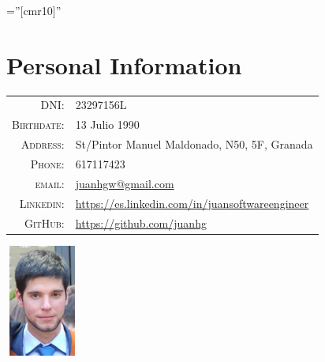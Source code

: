 \documentclass[a4paper,10pt]{article} %
\begin{document}
\pagestyle{empty} %

\font\fb=''[cmr10]'' %


\par{\bigskip\par} %

\section{Personal Information}

\noindent\begin{minipage}{0.3\textwidth}%
\begin{tabular}{rl}
\textsc{DNI:} & 23297156L \\
\textsc{Birthdate:} &  13 Julio 1990 \\
\textsc{Address:} & St/Pintor Manuel Maldonado, N50, 5F, Granada \\
\textsc{Phone:} & 617117423\\
\textsc{email:} & \href{mailto:juanhgw@gmail.com}{juanhgw@gmail.com} \\
\textsc{Linkedin:} & \url{https://es.linkedin.com/in/juansoftwareengineer} \\
\textsc{GitHub:} & \url{https://github.com/juanhg}
\end{tabular}
\end{minipage}%
\hfill%
\begin{minipage}{0.6\textwidth}\raggedleft
\includegraphics[width=24mm, height=37mm]{pictures/photo2}
\end{minipage}

\end{document}

